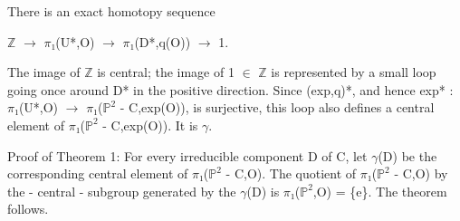 \documentclass[10pt,a4paper]{article}
\begin{document}
\begin{adjustbox}{max totalsize={\textwidth}{0.945\textheight},center}
\begin{minipage}{\textwidth}
\noindent There is an exact homotopy sequence\par\smallskip
\noindent \ensuremath{ℤ} \ensuremath{→} \ensuremath{π₁}(U*,O) \ensuremath{→} \ensuremath{π₁}(D*,q(O)) \ensuremath{→} 1.\par\smallskip
\noindent The image of \ensuremath{ℤ} is central; the image of 1 \ensuremath{∈} \ensuremath{ℤ} is represented by a small loop going once around D* in the positive direction. Since (exp,q)*, and hence exp* : \ensuremath{π₁}(U*,O) \ensuremath{→} \ensuremath{π₁}(\ensuremath{ℙ^2} - C,exp(O)), is surjective, this loop also defines a central element of \ensuremath{π₁}(\ensuremath{ℙ^2} - C,exp(O)). It is \ensuremath{γ}.\par\smallskip
{} Proof of Theorem 1: For every irreducible component D of C, let \ensuremath{γ}(D) be the corresponding central element of \ensuremath{π₁}(\ensuremath{ℙ^2} - C,O). The quotient of \ensuremath{π₁}(\ensuremath{ℙ^2} - C,O) by the - central - subgroup generated by the \ensuremath{γ}(D) is \ensuremath{π₁}(\ensuremath{ℙ^2},O) = \{e\}. The theorem follows.\par\smallskip
\end{minipage}
\end{adjustbox}
\newpage
\end{document}
